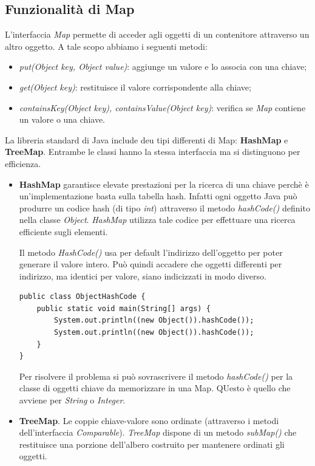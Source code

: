 \documentclass[12pt]{report}
\begin{document}
\subsection{Funzionalità di Map} L'interfaccia \textit{Map} permette di acceder agli oggetti di un contenitore attraverso un altro oggetto. A tale scopo abbiamo i seguenti metodi:
\begin{itemize}
	\item \textit{put(Object key, Object value)}: aggiunge un valore e lo associa con una chiave;
	\item \textit{get(Object key)}: restituisce il valore corrispondente alla chiave;
	\item \textit{containsKey(Object key), containsValue(Object key)}: verifica se \textit{Map} contiene un valore o una chiave.
\end{itemize}
La libreria standard di Java include deu tipi differenti di Map: \textbf{HashMap} e \textbf{TreeMap}. Entrambe le classi hanno la stessa interfaccia ma si distinguono per efficienza.
\begin{itemize}
	\item \textbf{HashMap} garantisce elevate prestazioni per la ricerca di una chiave perchè è un'implementazione basta sulla tabella hash. Infatti ogni oggetto Java può produrre un codice hash (di tipo \textit{int}) attraverso il metodo \textit{hashCode()} definito nella classe \textit{Object}. \textit{HashMap} utilizza tale codice per effettuare una ricerca efficiente sugli elementi.

	Il metodo \textit{HashCode()} usa per default l'indirizzo dell'oggetto per poter generare il valore intero. Può quindi accadere che oggetti differenti per indirizzo, ma identici per valore, siano indicizzati in modo diverso.
\begin{lstlisting}[style=javastyle]
public class ObjectHashCode {
	public static void main(String[] args) {
		System.out.println((new Object()).hashCode());
		System.out.println((new Object()).hashCode());
	}
}
\end{lstlisting}
Per risolvere il problema si può sovrascrivere il metodo \textit{hashCode()} per la classe di oggetti chiave da memorizzare in una Map. QUesto è quello che avviene per \textit{String} o \textit{Integer}.
	\item \textbf{TreeMap}. Le coppie chiave-valore sono ordinate (attraverso i metodi dell'interfaccia \textit{Comparable}). \textit{TreeMap} dispone di un metodo \textit{subMap()} che restituisce una porzione dell'albero costruito per mantenere ordinati gli oggetti.
\end{itemize}
\end{document}
